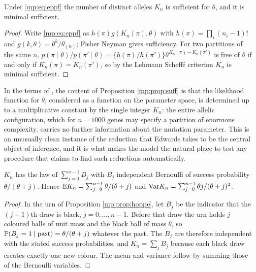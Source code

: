 \begin{proposition}
\label{mp:prop:suff}
Under \eqref{mp:eq:eppf} the number of distinct alleles $K_n$ is sufficient for $\theta$, and
it is minimal sufficient.
\end{proposition}

\begin{proof}
Write \eqref{mp:eq:eppf} as $h(\pi)g(K_n(\pi),\theta)$ with $h(\pi)=\prod_i(n_i-1)!$ and
$g(k,\theta)=\theta^k/\theta_{(n)}$; Fisher Neyman gives sufficiency. For two partitions of
the same $n$, $p(\pi\mid\theta)/p(\pi'\mid\theta)=\{h(\pi)/h(\pi')\}\theta^{K_n(\pi)-K_n(\pi')}$
is free of $\theta$ if and only if $K_n(\pi)=K_n(\pi')$, so by the Lehmann Scheff\'e
criterion $K_n$ is minimal sufficient.
\end{proof}

In the terms of \citet{mp:edwards1972}, the content of Proposition \ref{mp:prop:suff} is that the
likelihood function for $\theta$, considered as a function on the parameter space, is
determined up to a multiplicative constant by the single integer $K_n$: the entire allelic
configuration, which for $n=1000$ genes may specify a partition of enormous complexity,
carries no further information about the mutation parameter. This is an unusually clean
instance of the reduction that Edwards takes to be the central object of inference, and it is
what makes the model the natural place to test any procedure that claims to find such
reductions automatically.

\begin{proposition}
\label{mp:prop:feller}
$K_n$ has the law of $\sum_{j=0}^{n-1}B_j$ with $B_j$ independent Bernoulli of success
probability $\theta/(\theta+j)$. Hence
$\mathbb{E} K_n=\sum_{j=0}^{n-1}\theta/(\theta+j)$ and
$\mathrm{Var} K_n=\sum_{j=0}^{n-1}\theta j/(\theta+j)^2$.
\end{proposition}

\begin{proof}
In the urn of Proposition \ref{mp:prop:hoppe}, let $B_j$ be the indicator that the $(j+1)$th
draw is black, $j=0,\dots,n-1$. Before that draw the urn holds $j$ coloured balls of unit
mass and the black ball of mass $\theta$, so $\mathbb{P}(B_j=1\mid\text{past})=\theta/(\theta+j)$
whatever the past. The $B_j$ are therefore independent with the stated success
probabilities, and $K_n=\sum_jB_j$ because each black draw creates exactly one new colour.
The mean and variance follow by summing those of the Bernoulli variables.
\end{proof}

